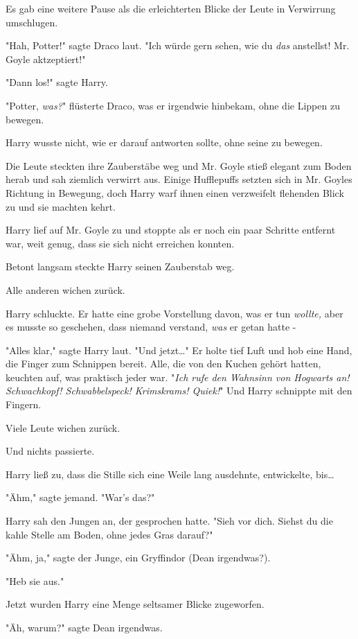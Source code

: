 {Es gab eine weitere Pause als die erleichterten Blicke der Leute in Verwirrung umschlugen.

"Hah, Potter!" sagte Draco laut. "Ich würde gern sehen, wie du \emph{das} anstellst! Mr. Goyle aktzeptiert!"

"Dann los!" sagte Harry.

"Potter, \emph{was?}" flüsterte Draco, was er irgendwie hinbekam, ohne die Lippen zu bewegen.

Harry wusste nicht, wie er darauf antworten sollte, ohne seine zu bewegen.

Die Leute steckten ihre Zauberstäbe weg und Mr. Goyle stieß elegant zum Boden herab und sah ziemlich verwirrt aus. Einige Hufflepuffs setzten sich in Mr. Goyles Richtung in Bewegung, doch Harry warf ihnen einen verzweifelt flehenden Blick zu und sie machten kehrt.

Harry lief auf Mr. Goyle zu und stoppte als er noch ein paar Schritte entfernt war, weit genug, dass sie sich nicht erreichen konnten.

Betont langsam steckte Harry seinen Zauberstab weg.

Alle anderen wichen zurück.

Harry schluckte. Er hatte eine grobe Vorstellung davon, was er tun \emph{wollte,} aber es musste so geschehen, dass niemand verstand, \emph{was} er getan hatte -

"Alles klar," sagte Harry laut. "Und jetzt…" Er holte tief Luft und hob eine Hand, die Finger zum Schnippen bereit. Alle, die von den Kuchen gehört hatten, keuchten auf, was praktisch jeder war. "\emph{Ich rufe den Wahnsinn von Hogwarts an!} \emph{Schwachkopf! Schwabbelspeck! Krimskrams! Quiek!}" Und Harry schnippte mit den Fingern.

Viele Leute wichen zurück.

Und nichts passierte.

Harry ließ zu, dass die Stille sich eine Weile lang ausdehnte, entwickelte, bis…

"Ähm," sagte jemand. "War's das?"

Harry sah den Jungen an, der gesprochen hatte. "Sieh vor dich. Siehst du die kahle Stelle am Boden, ohne jedes Gras darauf?"

"Ähm, ja," sagte der Junge, ein Gryffindor (Dean irgendwas?).

"Heb sie aus."

Jetzt wurden Harry eine Menge seltsamer Blicke zugeworfen.

"Äh, warum?" sagte Dean irgendwas.

}
